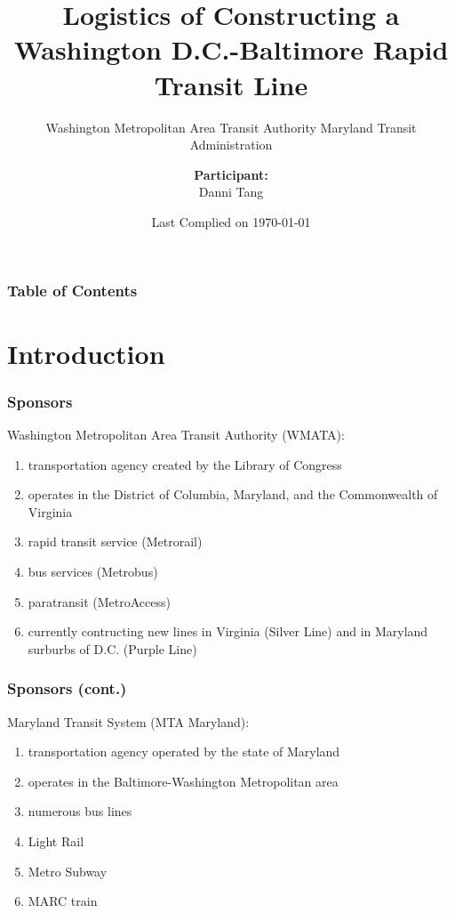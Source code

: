 \documentclass[compress,handout,10pt]{beamer}
\title{{\color{blue} \LARGE Logistics of Constructing a Washington D.C.-Baltimore Rapid Transit Line\newline} }
\subtitle{{\large Washington Metropolitan Area Transit Authority \newline \large Maryland Transit Administration} }
\author{ 
    {\bf{Participant:}} \\ 
Danni Tang \\ 
    \vspace{5pt}
}
\institute{Johs Hopkins University}
\date{\mygreen Last Complied on \today}
\let\olditem\item
\renewcommand{\item}{\setlength{\itemsep}{0.5\baselineskip}\olditem}
\begin{document}
\begin{frame}[plain]
    \titlepage
\end{frame}

\begin{frame}
    \frametitle{Table of Contents}
    \tableofcontents
\end{frame}

\section{Introduction}

\begin{frame}
    \frametitle{Sponsors}
    Washington Metropolitan Area Transit Authority (WMATA):
    \vspace{7pt}
             \begin{enumerate}
                 \item transportation agency created by the Library of Congress
		 \item operates in the District of Columbia, Maryland, and the Commonwealth of Virginia
                 \item rapid transit service (Metrorail)
                 \item bus services (Metrobus)
                 \item paratransit (MetroAccess)
                 \item currently contructing new lines in Virginia (Silver Line) and in Maryland surburbs of D.C. (Purple Line)
             \end{enumerate}
\end{frame}

\begin{frame}
    \frametitle{Sponsors (cont.)}
    Maryland Transit System (MTA Maryland):
    \vspace{7pt}
             \begin{enumerate}
                 \item transportation agency operated by the state of Maryland
                 \item operates in the Baltimore-Washington Metropolitan area
                 \item numerous bus lines
                 \item Light Rail
                 \item Metro Subway
		 \item MARC train
             \end{enumerate}
\end{frame}
\end{document}
